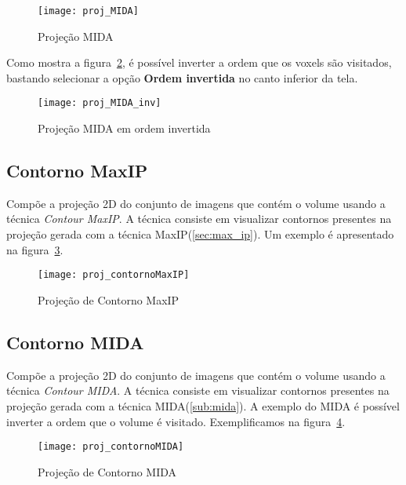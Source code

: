\begin{figure}[H]
\centering
\texttt{[image: proj\_MIDA]}
\caption{Projeção MIDA}
\label{fig:proj_MIDA}
\end{figure}

Como mostra a figura~\ref{fig:proj_MIDA_inv}, é possível inverter a ordem que os voxels são visitados, bastando selecionar a opção \textbf{Ordem invertida} no canto inferior da tela.

\begin{figure}[H]
\centering
\texttt{[image: proj\_MIDA\_inv]}
\caption{Projeção MIDA em ordem invertida}
\label{fig:proj_MIDA_inv}
\end{figure}

\subsection{Contorno MaxIP}

Compõe a projeção 2D do conjunto de imagens que contém o volume usando a técnica \textit{Contour MaxIP}. A técnica consiste em visualizar contornos presentes na projeção gerada com a técnica MaxIP(\ref{sec:max_ip}). Um exemplo é apresentado na figura~\ref{fig:proj_contorno_maxip}.

\begin{figure}[H]
\centering
\texttt{[image: proj\_contornoMaxIP]}
\caption{Projeção de Contorno MaxIP}
\label{fig:proj_contorno_maxip}
\end{figure}

\subsection{Contorno MIDA}

Compõe a projeção 2D do conjunto de imagens que contém o volume usando a técnica \textit{Contour MIDA}. A técnica consiste em visualizar contornos presentes na projeção gerada com a técnica MIDA(\ref{sub:mida}). A exemplo do MIDA é possível inverter a ordem que o volume é visitado. Exemplificamos na figura~\ref{fig:proj_contorno_mida}.

\begin{figure}[H]
\centering
\texttt{[image: proj\_contornoMIDA]}
\caption{Projeção de Contorno MIDA}
\label{fig:proj_contorno_mida}
\end{figure}